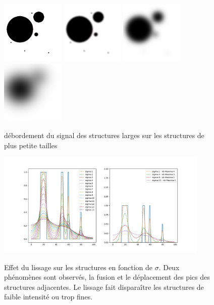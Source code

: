 \begin{figure}
  \centering
  \includegraphics[height=3cm]{Images/gaussian_spilling_init.png}
  \includegraphics[height=3cm]{Images/gaussian_spilling_g10.png}
  \includegraphics[height=3cm]{Images/gaussian_spilling_g40.png}
  \includegraphics[height=3cm]{Images/gaussian_spilling_g100.png}
  \label{fig:scale_space_spilling}
  \caption{débordement du signal des structures larges sur les structures de plus petite tailles}
\end{figure}

\begin{figure}
  \centering
  \includegraphics[height=5cm]{Images/GSP_experiment.png}
  \label{fig:scale_space_spilling2}
  \caption{Effet du lissage sur les structures en fonction de $\sigma$. Deux phénomènes sont observés, la fusion et le déplacement des pics des structures adjacentes. Le lissage fait disparaître les structures de faible intensité ou trop fines.}
\end{figure}



